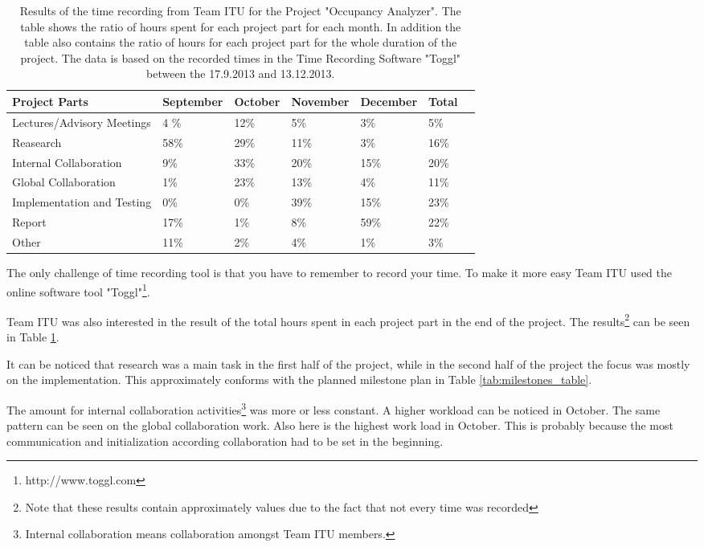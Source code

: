 \begin{table}[htb]
	\centering
	\begin{tabular}{ |  p{} |  p{2cm} |  p{2cm} |  p{2cm} |  p{2cm} |  p{2cm} |  p{2cm}|}
    		\hline
   		Project Parts & September & October & November & December & Total\\ \hline
    		Lectures/Advisory Meetings & 4 \% & 12\% & 5\% & 3\% & 5\% \\ \hline
    		Reasearch & 58\% & 29\% & 11\% & 3\% & 16\% \\ \hline
		Internal Collaboration & 9\% & 33\% & 20\% & 15\% & 20\%\\ \hline
    		Global Collaboration & 1\% & 23\% & 13\% & 4\% & 11\%\\ \hline
    		Implementation and Testing & 0\% & 0\% & 39\% & 15\% & 23\% \\ \hline
    		Report & 17\% & 1\%  & 8\% & 59\% & 22\% \\ \hline
 		Other & 11\% & 2\% & 4\% & 1\% & 3\%\\ \hline
	\end{tabular}
	\caption{Results of the time recording from Team ITU for the Project "Occupancy Analyzer". The table shows the ratio of hours spent for each project part for each month. In addition the table also contains the ratio of hours for each project part for the whole duration of the project. The data is based on the recorded times in the Time Recording Software "Toggl" between the 17.9.2013 and 13.12.2013.}
	\label{tab:timeRecResults}
\end{table}

The only challenge of time recording tool is that you have to remember to record your time. To make it more easy Team ITU used the online software tool "Toggl"\footnote{http://www.toggl.com}.

Team ITU was also interested in the result of the total hours spent in each project part in the end of the project. The results\footnote{Note that these results contain approximately values due to the fact that not every time was recorded} can be seen in Table \ref{tab:timeRecResults}.

It can be noticed that research was a main task in the first half of the project, while in the second half of the project the focus was mostly on the implementation. This approximately conforms with the planned milestone plan in Table \ref{tab:milestones_table}.

The amount for internal collaboration activities\footnote{Internal collaboration means collaboration amongst Team ITU members.} was more or less constant. A higher workload can be noticed in October. The same pattern can be seen on the global collaboration work. Also here is the highest work load in October. This is probably because the most communication and initialization according collaboration had to be set in the beginning.


